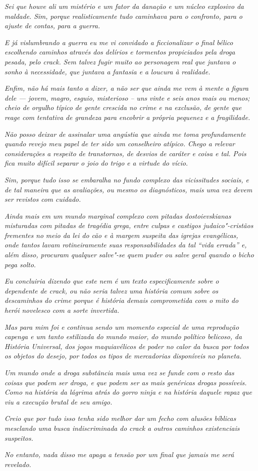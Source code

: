 \emph{Sei que houve ali um mistério e um fator da danação e um núcleo
explosivo da maldade. Sim, porque realisticamente tudo caminhava para o
confronto, para o ajuste de contas, para a guerra.}~

\emph{E já vislumbrando a guerra eu me vi convidado a ficcionalizar o
final bélico escolhendo caminhos através dos delírios e tormentos
propiciados pela droga pesada, pelo crack. Sem talvez fugir muito ao
personagem real que juntava o sonho à necessidade, que juntava a
fantasia e a loucura à realidade.}~

\emph{Enfim, não há mais tanto a dizer, a não ser que ainda me vem à
mente a figura dele --- jovem, magro, esguio, misterioso -- uns vinte e
seis anos mais ou menos; cheio de orgulho típico de gente crescida no
crime e na exclusão, de gente que reage com tentativa de grandeza para
encobrir a própria pequenez e a fragilidade.}~

\emph{Não posso deixar de assinalar uma angústia que ainda me toma
profundamente quando revejo meu papel de ter sido um conselheiro
atípico. Chego a relevar considerações a respeito de transtornos, de
desvios de caráter e coisa e tal. Pois fica muito difícil separar o joio
do trigo e a virtude do vício.}~

\emph{Sim, porque tudo isso se embaralha no fundo complexo das
vicissitudes sociais, e de tal maneira que as avaliações, ou mesmo os
diagnósticos, mais uma vez devem ser revistos com cuidado.}~

\emph{Ainda mais em um mundo marginal complexo com pitadas
dostoievskianas misturadas com pitadas de tragédia grega, entre culpas e
castigos judaico"-cristãos frementes no meio da lei do cão e à margem
suspeita das igrejas evangélicas, onde tantos lavam rotineiramente suas
responsabilidades da tal ``vida errada'' e, além disso, procuram
qualquer salve"-se quem puder ou salve geral quando o bicho pega solto.}~

\emph{Eu concluiria dizendo que este nem é um texto especificamente
sobre o dependente de crack, ou não seria talvez uma história comum sobre
os descaminhos do crime porque é história demais comprometida com o mito
do herói novelesco com a sorte invertida.}~

\emph{Mas para mim foi e continua sendo um momento especial de uma
reprodução capenga e um tanto estilizada do mundo maior, do mundo
político belicoso, da História Universal, dos jogos maquiavélicos de
poder no calor da busca por todos os objetos do desejo, por todos os
tipos de mercadorias disponíveis no planeta.}~

\emph{Um mundo onde a droga substância mais uma vez se funde com o resto
das coisas que podem ser droga, e que podem ser as mais genéricas drogas
possíveis. Como na história da lágrima atrás do gorro ninja e na história
daquele rapaz que viu a execução brutal de seu amigo.}~

\emph{Creio que por tudo isso tenha sido melhor dar um fecho com alusões
bíblicas mesclando uma busca indiscriminada do crack a outros caminhos
existenciais suspeitos.}~

\emph{No entanto, nada disso me apaga a tensão por um final que jamais
me será revelado.~}
\endgroup